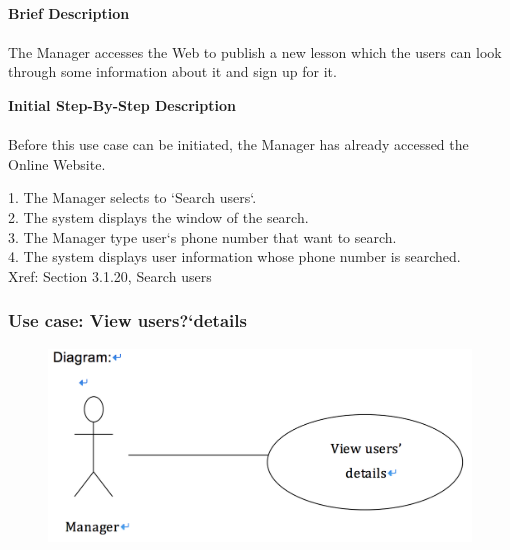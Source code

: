 \documentclass[12pt]{report}
\begin{document}
\paragraph{}
\begin{flushleft}
\textbf{Brief Description }
\paragraph{}
The Manager accesses the Web to publish a new lesson which the users can look through some information about it and sign up for it.\\

\begin{flushleft}
\textbf{Initial Step-By-Step Description }
\paragraph{}
Before this use case can be initiated, the Manager has already accessed the Online Website.

\begin{flushleft}
1.	The Manager selects to `Search users`. \\
2.	The system displays the window of the search. \\
3.	The Manager type user`s phone number that want to search. \\
4.	The system displays user information whose phone number is searched. \\
Xref: Section 3.1.20, Search users
\end{flushleft}
\end{flushleft}
\end{flushleft}

\newpage
\subsubsection{Use case:  View users?`details }

\begin{figure}[!htb]
  \includegraphics{27.PNG}
\end{figure}
\end{document}
